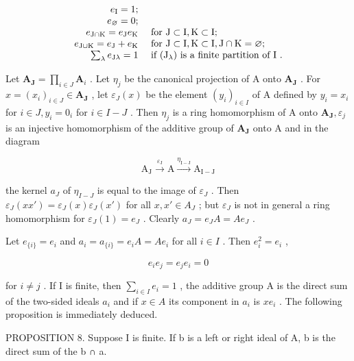 \[
\begin{array}{r l} e _ {\mathrm{I}} = 1; \\ e _ {\varnothing} = 0; \\ e _ {\mathrm{J} \cap \mathrm{K}} = e _ {\mathrm{J}} e _ {\mathrm{K}} & \text { for   } \mathrm{J} \subset \mathrm{I}, \mathrm{K} \subset \mathrm{I}; \\ e _ {\mathrm{J} \cup \mathrm{K}} = e _ {\mathrm{J}} + e _ {\mathrm{K}} & \text { for   } \mathrm{J} \subset \mathrm{I}, \mathrm{K} \subset \mathrm{I}, \mathrm{J} \cap \mathrm{K} = \varnothing ; \\ \sum_ {\lambda} e _ {\mathrm{J} \lambda} = 1 & \text { if   } (\mathrm{J} _ {\lambda}) \text {   is   a   finite   partition   of   I }. \end{array}
\]

Let \(\mathbf{A}_{\mathbf{J}} = \prod_{i\in J}\mathbf{A}_i\) . Let \(\eta_{j}\) be the canonical projection of A onto \(\mathbf{A}_{\mathbf{J}}\) . For \(x = (x_{i})_{i\in J}\in \mathbf{A}_{\mathbf{J}}\) , let \(\varepsilon_{J}(x)\) be the element \((y_{i})_{i\in I}\) of A defined by \(y_{i} = x_{i}\) for \(i\in J, y_{i} = 0_{i}\) for \(i\in I - J\) . Then \(\eta_{j}\) is a ring homomorphism of A onto \(\mathbf{A}_{\mathbf{J}},\varepsilon_{j}\) is an injective homomorphism of the additive group of \(\mathbf{A}_{\mathbf{J}}\) onto A and in the diagram

\[
\mathrm{A} _ {\mathrm{J}} \xrightarrow {\varepsilon_ {\mathrm{J}}} \mathrm{A} \xrightarrow {\eta_ {\mathrm{I} - \mathrm{J}}} \mathrm{A} _ {\mathrm{I} - \mathrm{J}}
\]

the kernel \(a_{J}\) of \(\eta_{I-J}\) is equal to the image of \(\varepsilon_{J}\) . Then \(\varepsilon_{J}(xx') = \varepsilon_{J}(x)\varepsilon_{J}(x')\) for all \(x, x' \in A_{J}\) ; but \(\varepsilon_{J}\) is not in general a ring homomorphism for \(\varepsilon_{J}(1) = e_{J}\) . Clearly \(a_{J} = e_{J}A = Ae_{J}\) .

Let \(e_{\{i\}} = e_i\) and \(a_i = a_{\{i\}} = e_i A = Ae_i\) for all \(i \in I\) . Then \(e_i^2 = e_i\) ,

\[
e _ {i} e _ {j} = e _ {j} e _ {i} = 0
\]

for \(i \neq j\) . If I is finite, then \(\sum_{i \in I} e_i = 1\) , the additive group A is the direct sum of the two-sided ideals \(a_i\) and if \(x \in A\) its component in \(a_i\) is \(xe_i\) . The following proposition is immediately deduced.

PROPOSITION 8. Suppose I is finite. If b is a left or right ideal of A, b is the direct sum of the b ∩ a.


